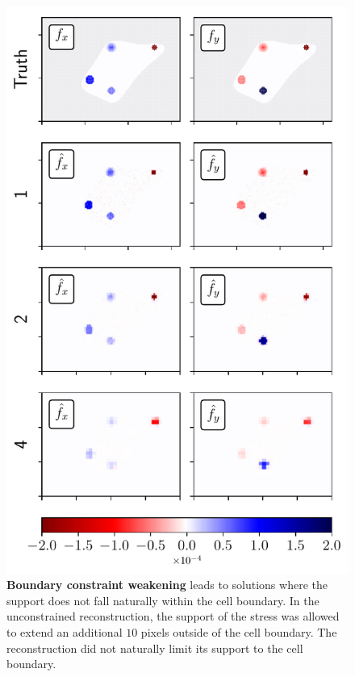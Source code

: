 \documentclass[aps,prl,reprint,twocolumn,groupedaddress,showpacs]{revtex4-1}
\begin{document}
\begin{figure}
\includegraphics[width=\linewidth]{fig4}
\caption{\textbf{Boundary constraint weakening} leads to solutions
  where the support does not fall naturally within the cell
  boundary. In the unconstrained reconstruction, the support of the
  stress was allowed to extend an additional $10$ pixels outside of
  the cell boundary. The reconstruction did not naturally limit its
  support to the cell boundary.}
\label{fig:fig4}
\end{figure}


\end{document}
